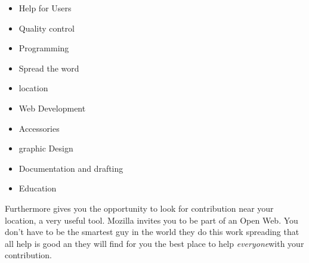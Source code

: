 \begin{itemize}
	\item Help for Users
	\item Quality control
	\item Programming
	\item Spread the word
	\item location
	\item Web Development
	\item Accessories
	\item graphic Design
	\item Documentation and drafting
	\item Education
\end{itemize}

\par Furthermore gives you the opportunity to look for contribution near your location, a very useful tool. Mozilla invites you to be part of an Open Web. You don't have to be the smartest guy in the world they do this work spreading that all help is good an they will find for you the best place to help \textit{everyone}with your contribution.

